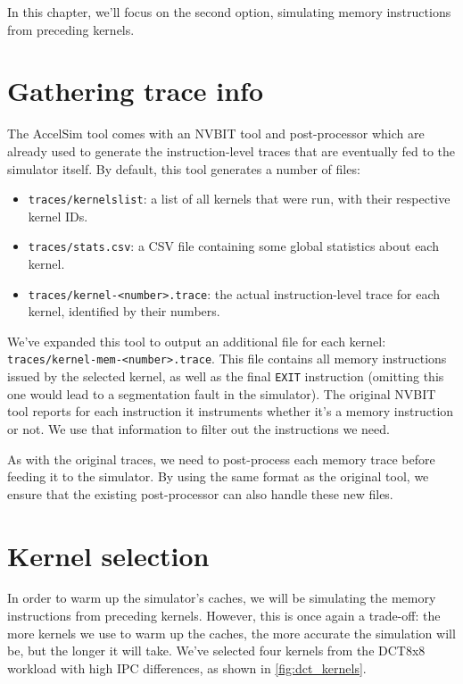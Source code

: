In this chapter, we'll focus on the second option, simulating memory instructions from preceding kernels.

\FloatBarrier
\section{Gathering trace info}\label{sec:trace-info}
The AccelSim\cite{accelsim} tool comes with an NVBIT\cite{nvbit} tool and post-processor which are already used to generate the instruction-level traces that are eventually fed to the simulator itself.
By default, this tool generates a number of files:
\begin{itemize}
    \item \verb|traces/kernelslist|: a list of all kernels that were run, with their respective kernel IDs.
    \item \verb|traces/stats.csv|: a CSV file containing some global statistics about each kernel.
    \item \verb|traces/kernel-<number>.trace|: the actual instruction-level trace for each kernel, identified by their numbers.
\end{itemize}

We've expanded this tool to output an additional file for each kernel: \verb|traces/kernel-mem-<number>.trace|.
This file contains all memory instructions issued by the selected kernel, as well as the final \verb|EXIT| instruction (omitting this one would lead to a segmentation fault in the simulator).
The original NVBIT tool reports for each instruction it instruments whether it's a memory instruction or not.
We use that information to filter out the instructions we need.

As with the original traces, we need to post-process each memory trace before feeding it to the simulator.
By using the same format as the original tool, we ensure that the existing post-processor can also handle these new files.

\FloatBarrier
\section{Kernel selection}\label{sec:kernel-selection}
In order to warm up the simulator's caches, we will be simulating the memory instructions from preceding kernels.
However, this is once again a trade-off: the more kernels we use to warm up the caches, the more accurate the simulation will be, but the longer it will take.
We've selected four kernels from the DCT8x8 workload with high IPC differences, as shown in \cref{fig:dct_kernels}.

